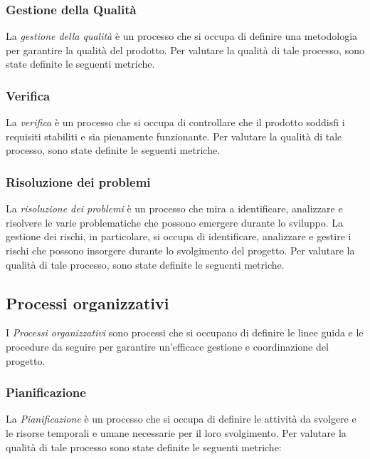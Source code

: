 \subsubsection{Gestione della Qualità}
La \emph{gestione della qualità} è un processo che si occupa di definire una metodologia per garantire la qualità del prodotto. Per valutare la qualità di tale processo, sono state definite le seguenti metriche.

\subsubsection{Verifica}
La \emph{verifica} è un processo che si occupa di controllare che il prodotto soddisfi i requisiti
stabiliti e sia pienamente funzionante. Per valutare la qualità di tale processo, sono state
definite le seguenti metriche.

\subsubsection{Risoluzione dei problemi}
La \emph{risoluzione dei problemi} è un processo che mira a identificare, analizzare e risolvere le
varie problematiche che possono emergere durante lo sviluppo. La gestione dei rischi,
in particolare, si occupa di identificare, analizzare e gestire i rischi che possono insorgere
durante lo svolgimento del progetto. Per valutare la qualità di tale processo, sono state
definite le seguenti metriche.

\subsection{Processi organizzativi}
I \emph{Processi organizzativi} sono processi che si occupano di definire le linee guida e le procedure da seguire per garantire un'efficace gestione e coordinazione del progetto.

\subsubsection{Pianificazione}
La \emph{Pianificazione} è un processo che si occupa di definire le attività da svolgere e le risorse temporali e umane necessarie per il loro svolgimento. Per valutare la qualità di tale processo sono state definite le seguenti metriche:
